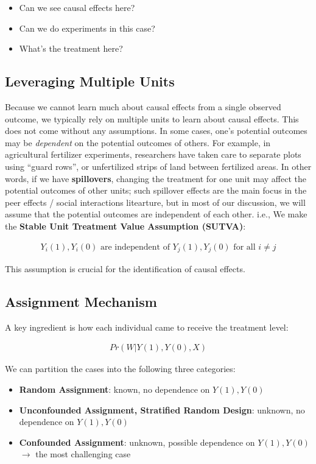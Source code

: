 \begin{itemize}
    \item Can we see causal effects here?
    \item Can we do experiments in this case?
    \item What's the treatment here?
\end{itemize}


\subsection{Leveraging Multiple Units}

Because we cannot learn much about causal effects from a single observed outcome, we typically rely on multiple units to learn about causal effects.
This does not come without any assumptions. In some cases, one's potential outcomes may be \textit{dependent} on the potential outcomes of others.
For example, in agricultural fertilizer experiments, researchers have taken care to separate plots using ``guard rows'', or unfertilized strips of land between fertilized areas.
In other words, if we have \textbf{spillovers}, changing the treatment for one unit may affect the potential outcomes of other units; such spillover effects are the main focus in the peer effects / social interactions litearture,
but in most of our discussion, we will assume that the potential outcomes are independent of each other. i.e., We make the \textbf{Stable Unit Treatment Value Assumption (SUTVA)}:

\begin{align*}
    Y_i(1), Y_i(0) \text{ are independent of } Y_j(1), Y_j(0) \text{ for all } i \neq j
\end{align*}

This assumption is crucial for the identification of causal effects.

\subsection{Assignment Mechanism}

A key ingredient is how each individual came to receive the treatment level:

\begin{align}
    Pr(W|Y(1), Y(0), X)
\end{align}

We can partition the cases into the following three categories:

\begin{itemize}
    \item \textbf{Random Assignment}: known, no dependence on $Y(1), Y(0)$
    \item \textbf{Unconfounded Assignment, Stratified Random Design}: unknown, no dependence on $Y(1), Y(0)$
    \item \textbf{Confounded Assignment}: unknown, possible dependence on $Y(1), Y(0)$ $\rightarrow$ the most challenging case
\end{itemize}

